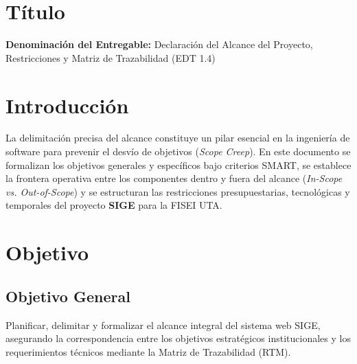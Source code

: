 \documentclass[12pt,a4paper]{article}
\begin{document}
\section{Título}
\textbf{Denominación del Entregable:} Declaración del Alcance del Proyecto, Restricciones y Matriz de Trazabilidad (EDT 1.4)



\section{Introducción}
La delimitación precisa del alcance constituye un pilar esencial en la ingeniería de software para prevenir el desvío de objetivos (\textit{Scope Creep}). En este documento se formalizan los objetivos generales y específicos bajo criterios SMART, se establece la frontera operativa entre los componentes dentro y fuera del alcance (\textit{In-Scope vs. Out-of-Scope}) y se estructuran las restricciones presupuestarias, tecnológicas y temporales del proyecto \textbf{SIGE} para la FISEI UTA.

\section{Objetivo}

\subsection{Objetivo General}
Planificar, delimitar y formalizar el alcance integral del sistema web SIGE, asegurando la correspondencia entre los objetivos estratégicos institucionales y los requerimientos técnicos mediante la Matriz de Trazabilidad (RTM).
\end{document}
